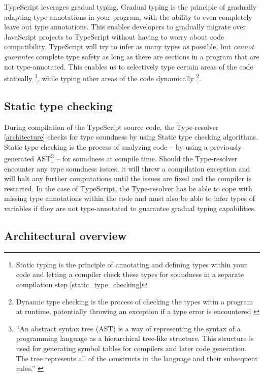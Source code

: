 \documentclass[english,runningheads, letterpaper]{llncs}[2018/03/10]
\begin{document}
TypeScript leverages gradual typing. Gradual typing is the principle
of gradually adapting type annotations in your program, with the ability
to even completely leave out type annotations. This enables developers to
gradually migrate over JavaScript projects to TypeScript without having
to worry about code compatibility. TypeScript will try to infer as
many types as possible, but \textit{cannot guarantee} complete type safety
as long as there are sections in a program that are not type-annotated. 
This enables us to selectively type certain areas of the code statically \footnote{Static typing is the principle of annotating and defining types within your code and letting a compiler check these types for soundness in a separate compilation step \ref{static_type_checking}\cite{ref_def_static_dynamic_type_checking}}, while typing other areas of the code dynamically \footnote{Dynamic type checking is the process of checking the types witin a program at runtime, potentially throwing an exception if a type error is encountered \cite{ref_def_static_dynamic_type_checking}}.

\subsection{Static type checking \label{static_type_checking}}

During compilation of the TypeScript source code, the Type-resolver \ref{architecture} checks for type soundness by using Static type checking algorithms.
Static type checking is the process of analyzing code -- by using a previously generated AST\footnote{``An abstract syntax tree (AST) is a way of representing the syntax of a programming language as a hierarchical tree-like structure. This structure is used for generating symbol tables for compilers and later code generation. The tree represents all of the constructs in the language and their subsequent rules.'' \cite{ref_def_ast}} -- for soundness at compile time. Should the Type-resolver encounter any type soundness issues, it will throw a compilation exception and will halt any further computations until the issues are fixed and the compiler is restarted. In the case of TypeScript, the Type-resolver has be able to cope with missing type annotations within the code and must also be able to infer types of variables if they are not type-annotated to guarantee gradual typing capabilities. \cite{ref_static_type_checking}

\subsection{Architectural overview \label{architecture}}
\end{document}
